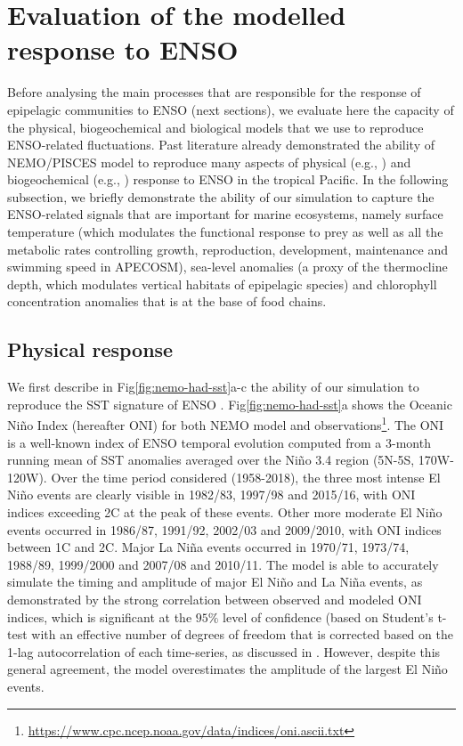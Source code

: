\section{Evaluation of the modelled response to ENSO}
\label{sec:model-val}

Before analysing the main processes that are responsible for the response of epipelagic communities to ENSO (next sections), we evaluate here the capacity of the physical, biogeochemical and biological models that we use to reproduce ENSO-related fluctuations. Past literature already demonstrated the ability of NEMO/PISCES model to reproduce many aspects of physical (e.g., \citealt{vialardModelStudyOceanic2001, lengaigneOceanResponseMarch2002}) and biogeochemical (e.g., \citealt{ masottiLargescaleShiftsPhytoplankton2011}) response to ENSO in the tropical Pacific. In the following subsection, we briefly demonstrate the ability of our simulation to capture the ENSO-related signals that are important for marine ecosystems, namely surface temperature (which modulates the functional response to prey as well as all the metabolic rates controlling growth, reproduction, development, maintenance and swimming speed in APECOSM), sea-level anomalies (a proxy of the thermocline depth, which modulates vertical habitats of epipelagic species) and chlorophyll concentration anomalies that is at the base of food chains.

\subsection{Physical response}

We first describe in Fig\ref{fig:nemo-had-sst}a-c the ability of our simulation to reproduce the SST signature of ENSO \citep{drushkaProcessesDrivingIntraseasonal2015, puyModulationEquatorialPacific2019, gorguesRevisitingNina19982010, martinezReconstructingGlobalChlorophylla2020}. Fig\ref{fig:nemo-had-sst}a shows the Oceanic Niño Index (hereafter ONI) for both NEMO model and observations\footnote{\url{https://www.cpc.ncep.noaa.gov/data/indices/oni.ascii.txt}}. The ONI is a well-known index of ENSO temporal evolution computed from a 3-month running mean of SST anomalies averaged over the Niño 3.4 region (5N-5S, 170W-120W). Over the time period considered (1958-2018), the three most intense El Niño events are clearly visible in 1982/83, 1997/98 and 2015/16, with ONI indices exceeding 2\degree{}C at the peak of these events. Other more moderate El Niño events occurred in 1986/87, 1991/92, 2002/03 and 2009/2010, with ONI indices between 1\degree{}C and 2\degree{}C. Major La Niña events occurred in 1970/71, 1973/74, 1988/89, 1999/2000 and 2007/08 and 2010/11. The model is able to accurately simulate the timing and amplitude of major El Niño and La Niña events, as demonstrated by the strong correlation between observed and modeled ONI indices, which is significant at the $95\%$ level of confidence (based on Student's t-test with an effective number of degrees of freedom that is corrected based on the 1-lag autocorrelation of each time-series, as discussed in \cite{brethertonEffectiveNumberSpatial1999}. However, despite this general agreement, the model overestimates the amplitude of the largest El Niño events. 

